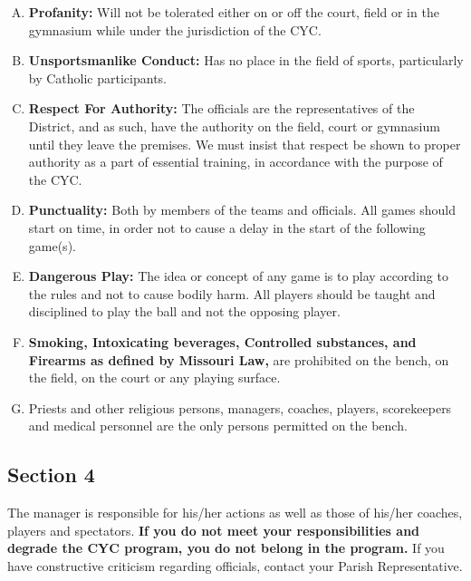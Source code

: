\begin{enumerate}[A.]
    \item \textbf{Profanity:} Will not be tolerated either on or off the court, field or in the gymnasium while under the jurisdiction of the CYC.
    
    \item \textbf{Unsportsmanlike Conduct:} Has no place in the field of sports, particularly by Catholic participants.

    \item \textbf{Respect For Authority:} The officials are the representatives of the District, and as such, have the authority on the field, court or  gymnasium until they leave the premises. We must insist that respect be shown to proper authority as a part of essential training, in accordance with the purpose of the CYC.
    
    \item \textbf{Punctuality:} Both by members of the teams and officials.  All games should start on time, in order not to cause a delay in the start of the following game(s).

    \item \textbf{Dangerous Play:} The idea or concept of any game is to play according to the rules and not to cause bodily harm. All players should be taught and disciplined to play the ball and not the opposing player.

    \item \textbf{Smoking, Intoxicating beverages, Controlled substances, and Firearms as defined by Missouri Law,} are prohibited on the bench, on the field, on the court or any playing surface.

    \item Priests and other religious persons, managers, coaches, players, scorekeepers and medical personnel are the only persons permitted on the bench.
\end{enumerate}

\subsection{Section 4}
\label{ssec:bylaw-4-4}
The manager is responsible for his/her actions as well as those of his/her coaches, players and spectators.  \textbf{If you do not meet your responsibilities and degrade the CYC program, you do not belong in the program.}  If you have constructive criticism regarding officials, contact your Parish Representative.

